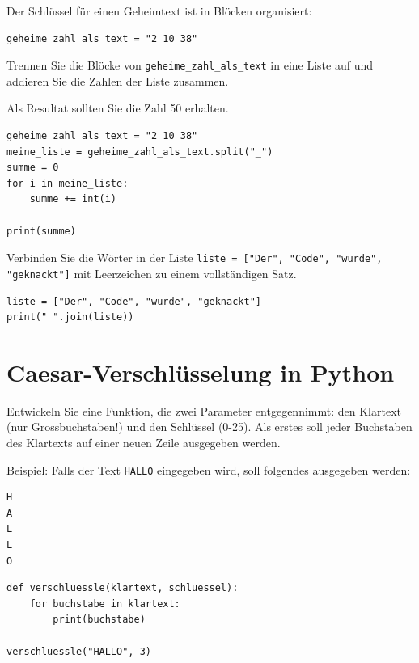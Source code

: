  \begin{myexercise}
Der Schlüssel für einen Geheimtext ist in Blöcken organisiert:

\begin{lstlisting}
geheime_zahl_als_text = "2_10_38"
\end{lstlisting}

Trennen Sie die Blöcke von \lstinline|geheime_zahl_als_text| in eine Liste auf und addieren Sie die Zahlen der Liste zusammen.

Als Resultat sollten Sie die Zahl 50 erhalten.
\begin{myanswer}
\begin{lstlisting}
geheime_zahl_als_text = "2_10_38"
meine_liste = geheime_zahl_als_text.split("_")
summe = 0
for i in meine_liste:
    summe += int(i)
    
print(summe)
\end{lstlisting}
\end{myanswer}
 \end{myexercise}
 
 \begin{myexercise}
Verbinden Sie die Wörter in der Liste \lstinline|liste = ["Der", "Code", "wurde", "geknackt"]| mit Leerzeichen zu einem vollständigen Satz.
\begin{myanswer}
\begin{lstlisting}
liste = ["Der", "Code", "wurde", "geknackt"]
print(" ".join(liste))
\end{lstlisting}
\end{myanswer}
 \end{myexercise}

\newpage
\section{Caesar-Verschlüsselung in Python}
\begin{myexercise}\label{ex:oneline}
Entwickeln Sie eine Funktion, die zwei Parameter entgegennimmt: den Klartext (nur Grossbuchstaben!) und den Schlüssel (0-25). Als erstes soll jeder Buchstaben des Klartexts auf einer neuen Zeile ausgegeben werden. 

Beispiel: Falls der Text \texttt{HALLO} eingegeben wird, soll folgendes ausgegeben werden:
\begin{lstlisting}[language=bash]
H
A
L
L
O
\end{lstlisting}
\begin{myanswer}
\begin{lstlisting}
def verschluessle(klartext, schluessel):
    for buchstabe in klartext:
        print(buchstabe)

verschluessle("HALLO", 3)
\end{lstlisting}
\end{myanswer}
\end{myexercise}

